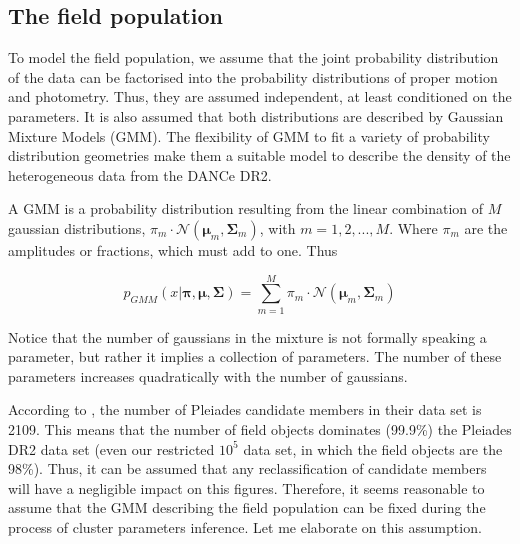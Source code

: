 \subsection{The field population}
To model the field population, we assume that the joint probability distribution of the data can be factorised into the probability distributions of proper motion and photometry. Thus, they are assumed independent, at least conditioned on the parameters. It is also assumed that both distributions are described by Gaussian Mixture Models (GMM). The flexibility of GMM to fit a variety of probability distribution geometries make them a suitable model to describe the density of the heterogeneous data from the DANCe DR2. 

A GMM is a probability distribution resulting from the linear combination of $M$ gaussian distributions, $\pi_m\cdot \mathcal{N}(\boldsymbol{\mu}_m,\boldsymbol{\Sigma}_m)$, with $m=1,2,...,M$. Where $\pi_m$ are the amplitudes or fractions, which must add to one. Thus

\begin{equation}
p_{GMM}(x|\boldsymbol{\pi},\boldsymbol{\mu},\boldsymbol{\Sigma})=\sum_{m=1}^M \pi_m \cdot \mathcal{N}(\boldsymbol{\mu}_m,\boldsymbol{\Sigma}_m)
\end{equation}

Notice that the number of gaussians in the mixture is not formally speaking a parameter, but rather it implies a collection of parameters. The number of these parameters increases quadratically with the number of gaussians. 

According to \citet{Bouy2015}, the number of Pleiades candidate members in their data set is 2109. This means that the number of field objects dominates (99.9\%) the Pleiades DR2 data set (even our restricted $10^5$ data set, in which the field objects are the 98\%). Thus, it can be assumed that any reclassification of candidate members will have a negligible impact on this figures. Therefore, it seems reasonable to assume that the GMM describing the field population can be fixed during the process of cluster parameters inference. Let me elaborate on this assumption.

